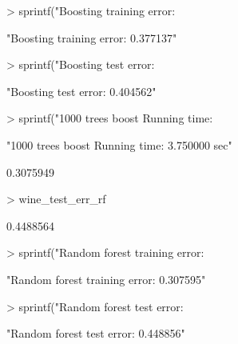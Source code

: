 \documentclass{article}
\begin{document}
\begin{Schunk}
\begin{Soutput}
\end{Soutput}
\begin{Sinput}
> sprintf("Boosting training error: %f", wine_train_error_bm)
\end{Sinput}
\begin{Soutput}
[1] "Boosting training error: 0.377137"
\end{Soutput}
\begin{Sinput}
> sprintf("Boosting test error: %f", wine_test_error_bm)
\end{Sinput}
\begin{Soutput}
[1] "Boosting test error: 0.404562"
\end{Soutput}
\begin{Sinput}
> sprintf("1000 trees boost Running time: %f sec", ptm_bm[3])
\end{Sinput}
\begin{Soutput}
[1] "1000 trees boost Running time: 3.750000 sec"
\end{Soutput}
\begin{Soutput}
[1] 0.3075949
\end{Soutput}
\begin{Sinput}
> wine_test_err_rf
\end{Sinput}
\begin{Soutput}
[1] 0.4488564
\end{Soutput}
\begin{Sinput}
> sprintf("Random forest training error: %f", wine_train_err_rf)
\end{Sinput}
\begin{Soutput}
[1] "Random forest training error: 0.307595"
\end{Soutput}
\begin{Sinput}
> sprintf("Random forest test error: %f", wine_test_err_rf)
\end{Sinput}
\begin{Soutput}
[1] "Random forest test error: 0.448856"
\end{Soutput}

\end{Schunk}
\end{document}
